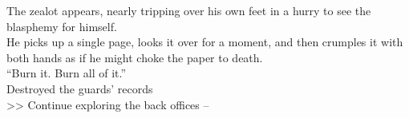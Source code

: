 The zealot appears, nearly tripping over his own feet in a hurry to see the blasphemy for himself.\\

He picks up a single page, looks it over for a moment, and then crumples it with both hands as if he might choke the paper to death.\\

“Burn it. Burn all of it.”\\
 Destroyed the guards’ records \\

>> Continue exploring the back offices -- 
